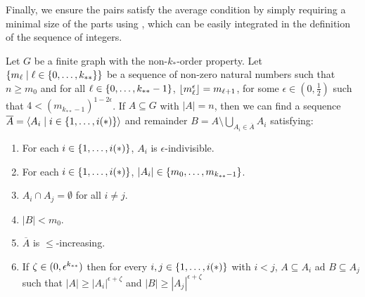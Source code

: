         Finally, we ensure the pairs satisfy the average condition by simply requiring a minimal size of the parts
        using ,
        which can be easily integrated in the definition of the sequence of integers.

        \begin{lemma} \label{lem:existance_of_ordered_f_indivisible_partitions_with_exceptions_bound}
            Let $G$ be a finite graph with the non-$k_{*}$-order property.
            Let $\{ m_\ell \mid \ell \in \{ 0, \dots, k_{**} \} \}$ be a sequence of non-zero natural numbers such that
            $n \geq m_0$ and for all $\ell \in \{ 0, \dots, k_{**}-1 \}$, $\left\lfloor m_\ell^\epsilon \right\rfloor = m_{\ell+1}$,
            for some $\epsilon \in (0, \frac{1}{2})$ such that $4 < (m_{k_{**}-1})^{1-2\epsilon}$.
            If $A \subseteq G$ with $|A| = n$, then we can find a sequence $\overline{A} = \left< A_i \mid i \in \{ 1, \dots, i(*) \} \right>$
            and remainder $B = A \setminus \bigcup_{A_i \in \overline{A}} A_i$ satisfying:
            \begin{enumerate}[label={\Roman*}., ref={\Roman*}, font=\rmfamily]
                \item \label{itm:existance_of_ordered_f_indivisible_partitions_with_exceptions_bound.1} For each $i \in \{ 1, \dots, i(*) \}$, $A_i$ is $\epsilon$-indivisible.
                \item \label{itm:existance_of_ordered_f_indivisible_partitions_with_exceptions_bound.2} For each $i \in \{ 1, \dots, i(*) \}$, $|A_i| \in \{ m_0, \dots, m_{k_{**}-1} \}$.
                \item \label{itm:existance_of_ordered_f_indivisible_partitions_with_exceptions_bound.3} $A_i \cap A_j = \emptyset$ for all $i \neq j$.
                \item \label{itm:existance_of_ordered_f_indivisible_partitions_with_exceptions_bound.4} $|B| < m_0$.
                \item \label{itm:existance_of_ordered_f_indivisible_partitions_with_exceptions_bound.5} $\overline{A}$ is $\leq$-increasing.
                \item \label{itm:existance_of_ordered_f_indivisible_partitions_with_exceptions_bound.6} If $\zeta \in ( 0,\epsilon^{k_{**}} )$ then for every $i,j \in \{ 1, \dots, i(*) \}$ with $i < j$,
                    $A \subseteq A_i$ ad $B \subseteq A_j$ such that $|A| \geq |A_i|^{\epsilon + \zeta}$ and $|B| \geq |A_j|^{\epsilon + \zeta}$

\end{enumerate}
\end{lemma}

